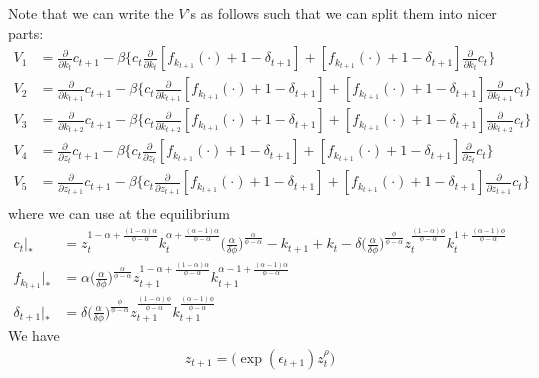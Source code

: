 \documentclass[a4paper]{article}
\theoremstyle{definition}
\begin{document}
\newpage	
Note that we can write the $V$'s as follows such that we can split them into nicer parts:
	\begin{align*}
	V_1 	&= \frac{\partial}{\partial k_t}c_{t+1} - \beta \Big\{ c_t \frac{\partial}{\partial k_t}[f_{k_{t+1}}(\cdot)+1-\delta_{t+1}] + [f_{k_{t+1}}(\cdot)+1-\delta_{t+1}]\frac{\partial}{\partial k_t}c_t \Big\} \\
	V_2 	&= \frac{\partial}{\partial k_{t+1}}c_{t+1} - \beta \Big\{ c_t \frac{\partial}{\partial k_{t+1}}[f_{k_{t+1}}(\cdot)+1-\delta_{t+1}] + [f_{k_{t+1}}(\cdot)+1-\delta_{t+1}]\frac{\partial}{\partial k_{t+1}}c_t \Big\} \\
	V_3 	&= \frac{\partial}{\partial k_{t+2}}c_{t+1} - \beta \Big\{ c_t \frac{\partial}{\partial k_{t+2}}[f_{k_{t+1}}(\cdot)+1-\delta_{t+1}] + [f_{k_{t+1}}(\cdot)+1-\delta_{t+1}]\frac{\partial}{\partial k_{t+2}}c_t \Big\} \\	
	V_4 	&= \frac{\partial}{\partial z_{t}}c_{t+1} - \beta \Big\{ c_t \frac{\partial}{\partial z_{t}}[f_{k_{t+1}}(\cdot)+1-\delta_{t+1}] + [f_{k_{t+1}}(\cdot)+1-\delta_{t+1}]\frac{\partial}{\partial z_{t}}c_t \Big\} \\		
	V_5 	&= \frac{\partial}{\partial z_{t+1}}c_{t+1} - \beta \Big\{ c_t \frac{\partial}{\partial z_{t+1}}[f_{k_{t+1}}(\cdot)+1-\delta_{t+1}] + [f_{k_{t+1}}(\cdot)+1-\delta_{t+1}]\frac{\partial}{\partial z_{t+1}}c_t \Big\} \\		
	\end{align*}	
where we can use at the equilibrium
	\begin{align*}
	c_t |_* 			&= z_{t}^{1-\alpha+\frac{(1-\alpha)\alpha}{\phi-\alpha}} k_{t}^{\alpha+\frac{(\alpha-1)\alpha}{\phi-\alpha}} \Big( \frac{\alpha}{\delta\phi} \Big)^{\frac{\alpha}{\phi-\alpha}}-k_{t+1} + k_{t} - \delta \Big( \frac{\alpha}{\delta\phi} \Big)^{\frac{\phi}{\phi-\alpha}}z_{t}^{\frac{(1-\alpha)\phi}{\phi-\alpha}}k_{t}^{1+\frac{(\alpha-1)\phi}{\phi-\alpha}} \\
	f_{k_{t+1}} |_*	&= \alpha \Big( \frac{\alpha}{\delta\phi} \Big)^{\frac{\alpha}{\phi-\alpha}} z_{t+1}^{1-\alpha+\frac{(1-\alpha)\alpha}{\phi-\alpha}}k_{t+1}^{\alpha-1+\frac{(\alpha-1)\alpha}{\phi-\alpha}} \\
	\delta_{t+1}|_*	&=\delta \Big( \frac{\alpha}{\delta\phi} \Big)^{\frac{\phi}{\phi-\alpha}}z_{t+1}^{\frac{(1-\alpha)\phi}{\phi-\alpha}}k_{t+1}^{\frac{(\alpha-1)\phi}{\phi-\alpha}}
	\end{align*}	
\newpage
We have
	\begin{align*}
	z_{t+1} = \Big( \exp(\epsilon_{t+1}) z_t^{\rho} \Big)
	\end{align*}
\end{document}
